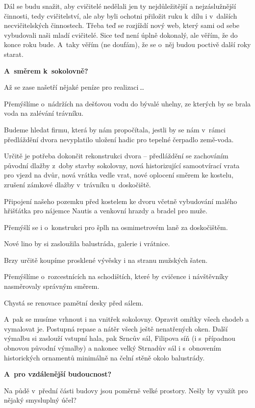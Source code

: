 \documentclass[11pt]{article}
\begin{document}
Dál se budu snažit, aby cvičitelé nedělali jen ty nejdůležitější a nejzáslužnější činnosti, tedy cvičitelství, ale aby byli ochotni přiložit ruku k~dílu i v~dalších necvičitelských činnostech. Třeba teď se rozjíždí nový web, který sami od sebe vybudovali naši mladí cvičitelé. Sice teď není úplně dokonalý, ale věřím, že do konce roku bude. A~taky věřím (ne doufám), že se o~něj budou poctivě další roky starat.  

\textbf{A~směrem k~sokolovně?}

Až se zase našetří nějaké peníze pro realizaci\,\ldots

Přemýšlíme o~nádržích na dešťovou vodu do bývalé uhelny, ze kterých by se brala voda na zalévání trávníku.

Budeme hledat firmu, která by nám propočítala, jestli by se nám v~rámci předláždění dvora nevyplatilo uložení hadic pro tepelné čerpadlo země-voda.

Určitě je potřeba dokončit rekonstrukci dvora – předláždění se zachováním původní dlažby z~doby stavby sokolovny, nová historizující samootvírací vrata pro vjezd na dvůr, nová vrátka vedle vrat, nové oplocení směrem ke kostelu, zrušení zámkové dlažby v~trávníku u~doskočiště.

Připojení našeho pozemku před kostelem ke dvoru včetně vybudování malého hřišťátka pro nájemce Nautis a venkovní hrazdy a bradel pro muže.

Přemýšlí se i o~konstrukci pro šplh na osmimetrovém laně za doskočištěm.

Nové lino by si zasloužila balustráda, galerie i vrátnice.

Brzy určitě koupíme prosklené vývěsky i na stranu mužských šaten.

Přemýšlíme o~rozcestnících na schodištích, které by cvičence i návštěvníky nasměrovaly správným směrem.

Chystá se renovace pamětní desky před sálem.

A~pak se musíme vrhnout i na vnitřek sokolovny. Opravit omítky všech chodeb a vymalovat je. Postupná repase a nátěr všech ještě nenatřených oken. Další výmalbu si zaslouží vstupní hala, pak Srncův sál, Filipova síň (i s~případnou obnovou původní výmalby) a nakonec velký Strnadův sál i s~obnovením historických ornamentů minimálně na čelní stěně okolo balustrády.

\textbf{A~pro vzdálenější budoucnost?}

Na půdě v~přední části budovy jsou poměrně velké prostory. Nešly by využít pro nějaký smysluplný účel?
\end{document}
